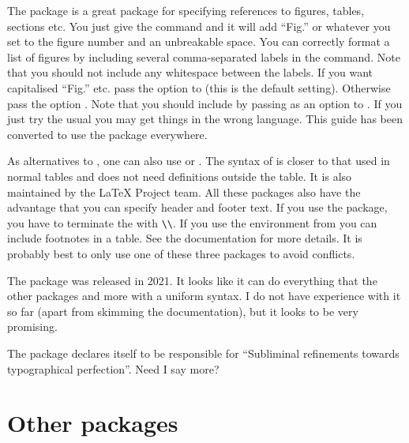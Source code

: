 The  package is a great package for specifying references to
figures, tables, sections etc.
You just give the command  and it will add \enquote{Fig.} or whatever
you set to the figure number and an unbreakable space.
You can correctly format a list of figures by including several comma-separated labels in the  command.
Note that you should not include any whitespace between the labels.
If you want capitalised \enquote{Fig.} etc. pass the option 
to  (this is the default setting).
Otherwise pass the option .
Note that you should include  by passing  
as an option to .
If you just try the usual  you may get things in the wrong language.
This guide has been converted to use the  package everywhere.

As alternatives to , one can also use
 or . 
The syntax of  is closer to that used in normal tables
and does not need definitions outside the table.
It is also maintained by the \LaTeX{} Project team.
All these packages also have the advantage that you
can specify header and footer text.
If you use the  package,
you have to terminate the  with \verb|\\|.
If you use the  environment from  
you can include footnotes in a table.
See the  documentation for more details.
It is probably best to only use one of these three packages to avoid conflicts.

The package  was released in 2021.
It looks like it can do everything that the other packages and more with a uniform syntax.
I do not have experience with it so far (apart from skimming the documentation),
but it looks to be very promising.

The package  declares itself to be responsible for
\enquote{Subliminal refinements towards typographical perfection}.
Need I say more?

\section{Other packages}%
\label{sec:package:other}

